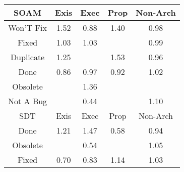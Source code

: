 \begin{tabular}{|c||c|c|c|c|}
\hline
\hline
SOAM & Exis & Exec & Prop & Non-Arch \\ 
\hline
Won'T Fix & \cellcolor[rgb]{0.8147273801101239,0.7948708642626902,0.42} 1.52 & \cellcolor[rgb]{0.8883075045046622,0.7373221879887342,0.399753670871018} 0.88 & \cellcolor[rgb]{0.8364814861930401,0.8051754408282821,0.41999999999999993} 1.40 & \cellcolor[rgb]{0.9057447309558062,0.8198583931908154,0.4160284155587523} 0.98 \\ 
\hline
Fixed & \cellcolor[rgb]{0.9043730374377373,0.8373345966810335,0.42} 1.03 & \cellcolor[rgb]{0.9053265673439267,0.83778626874186,0.42} 1.03 &  & \cellcolor[rgb]{0.9089724334112433,0.8351361848132183,0.41904093785049373} 0.99 \\ 
\hline
Duplicate & \cellcolor[rgb]{0.8643234460473171,0.8183637376013607,0.42} 1.25 &  & \cellcolor[rgb]{0.8134458895439269,0.7942638424155444,0.42000000000000004} 1.53 & \cellcolor[rgb]{0.9037158096536987,0.8102548323608401,0.41413475567678537} 0.96 \\ 
\hline
Done & \cellcolor[rgb]{0.8851137409456135,0.7222050404759032,0.39677282488257243} 0.86 & \cellcolor[rgb]{0.904921345785395,0.8159610367175357,0.4152599227330352} 0.97 & \cellcolor[rgb]{0.8958751961161153,0.7731425949496125,0.4068168497083743} 0.92 & \cellcolor[rgb]{0.9071057395930646,0.8386290345440832,0.42} 1.02 \\ 
\hline
Obsolete &  & \cellcolor[rgb]{0.8433757717859104,0.8084411550564838,0.42} 1.36 &  &  \\ 
\hline
Not A Bug &  & \cellcolor[rgb]{0.8120929931937709,0.37657350111718224,0.32862012698085286} 0.44 &  & \cellcolor[rgb]{0.8909906130044912,0.8309955535284431,0.42} 1.10 \\ 
\hline
\hline
SDT & Exis & Exec & Prop & Non-Arch \\ 
\hline
Done & \cellcolor[rgb]{0.8709061155662828,0.8214818442156077,0.42} 1.21 & \cellcolor[rgb]{0.8242773396021796,0.799394529285243,0.42} 1.47 & \cellcolor[rgb]{0.8360733466401495,0.4900805074300411,0.3510017901974729} 0.58 & \cellcolor[rgb]{0.8997406865296681,0.7914392495737625,0.4104246407610236} 0.94 \\ 
\hline
Obsolete &  & \cellcolor[rgb]{0.8296716886613735,0.4597793263305011,0.3450269094172819} 0.54 &  & \cellcolor[rgb]{0.9007071675996915,0.8355981320209065,0.42} 1.05 \\ 
\hline
Fixed & \cellcolor[rgb]{0.8584671604506863,0.5960778927999151,0.3719026830873072} 0.70 & \cellcolor[rgb]{0.8807657704684755,0.7016246468841173,0.3927147191039104} 0.83 & \cellcolor[rgb]{0.8845820010505782,0.8279598952344843,0.42} 1.14 & \cellcolor[rgb]{0.9045807552258418,0.837432989317504,0.42} 1.03 \\ 

\end{tabular}
